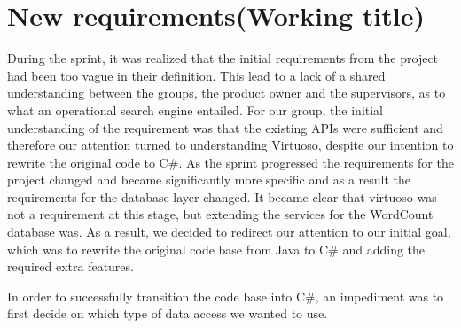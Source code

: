\section{New requirements(Working title)} \label{ssec:newRequirements}
During the sprint, it was realized that the initial requirements from the \knox{} project had been too vague in their definition. This lead to a lack of a shared understanding between the groups, the product owner and the supervisors, as to what an operational search engine entailed. For our group, the initial understanding of the requirement was that the existing APIs were sufficient and therefore our attention turned to understanding Virtuoso, despite our intention to rewrite the original code to C\#. 
As the sprint progressed the requirements for the \knox{} project changed and became significantly more specific and as a result the requirements for the database layer changed. It became clear that virtuoso was not a requirement at this stage, but extending the services for the WordCount database was. As a result, we decided to redirect our attention to our initial goal, which was to rewrite the original code base from Java to C\# and adding the required extra features.

In order to successfully transition the code base into C\#, an impediment was to first decide on which type of data access we wanted to use.


